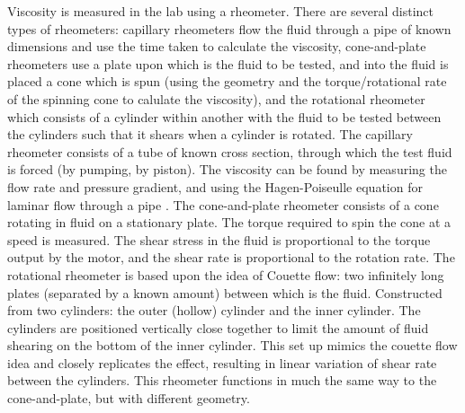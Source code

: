 \documentclass[twoside,a4]{report}
\def\br{\newline \newline \noindent}
\begin{document}
	\noindent
	Viscosity is measured in the lab using a rheometer. There are several distinct types of rheometers: capillary rheometers flow the fluid through a pipe of known dimensions and use the time taken to calculate the viscosity, cone-and-plate rheometers use a plate upon which is the fluid to be tested, and into the fluid is placed a cone which is spun (using the geometry and the torque/rotational rate of the spinning cone to calulate the viscosity), and the rotational rheometer which consists of a cylinder within another with the fluid to be tested between the cylinders such that it shears when a cylinder is rotated. \br
	The capillary rheometer consists of a tube of known cross section, through which the test fluid is forced (by pumping, by piston). The viscosity can be found by measuring the flow rate and pressure gradient, and using the Hagen-Poiseulle equation for laminar flow through a pipe \cite{backcaprheom}.\br
	The cone-and-plate rheometer consists of a cone rotating in fluid on a stationary plate. The torque required to spin the cone at a speed is measured. The shear stress in the fluid is proportional to the torque output by the motor, and the shear rate is proportional to the rotation rate.\br %
	The rotational rheometer is based upon the idea of Couette flow: two infinitely long plates (separated by a known amount) between which is the fluid. Constructed from two cylinders: the outer (hollow) cylinder and the inner cylinder. The cylinders are positioned vertically close together to limit the amount of fluid shearing on the bottom of the inner cylinder. This set up mimics the couette flow idea and closely replicates the effect, resulting in linear variation of shear rate between the cylinders. This rheometer functions in much the same way to the cone-and-plate, but with different geometry.
	
\end{document}
